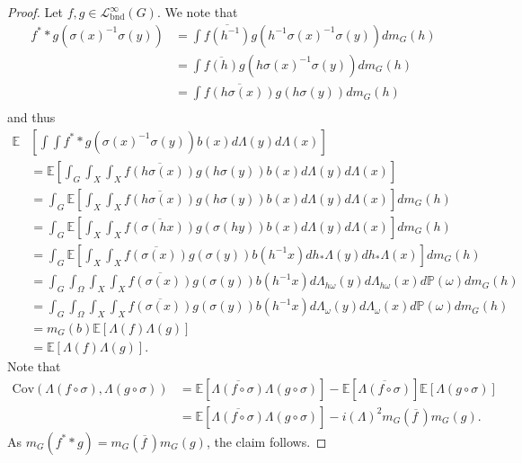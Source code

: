 \documentclass[12pt,reqno,a4paper]{amsart}
\theoremstyle{theorem}
\theoremstyle{definition}
\numberwithin{theorem}{section}
\numberwithin{equation}{section}
\begin{document}
\begin{proof}
	Let $f,g\in \mathcal{L}_{\mathrm{bnd}}^\infty(G)$. We note that
	\begin{align*}
		f^**g(\sigma(x)^{-1}\sigma(y)) &= \int \overline{f(h^{-1})}g(h^{-1}\sigma(x)^{-1}\sigma(y))dm_G(h)\\
		&= \int \overline{f(h)}g(h\sigma(x)^{-1}\sigma(y))dm_G(h)\\
		&= \int \overline{f(h\sigma(x))}g(h\sigma(y))dm_G(h)\\
	\end{align*}
	and thus
	\begin{align*}
		\mathbb{E}&\left[\int \int f^**g(\sigma(x)^{-1}\sigma(y))b(x)d\Lambda(y)d\Lambda(x)\right]\\
		&=\mathbb{E}\left[  \int_G \int_X\int_X \overline{f(h\sigma(x))}g(h\sigma(y))b(x)d\Lambda(y)d\Lambda(x)\right]\\
		&=  \int_G\mathbb{E}\left[\int_X \int_X  \overline{f(h\sigma(x))}g(h\sigma(y))b(x)d\Lambda(y)d\Lambda(x)\right]dm_G(h)\\
		&= \int_G\mathbb{E}\left[\int_X \int_X  \overline{f(\sigma(hx))}g(\sigma(hy))b(x)d\Lambda(y)d\Lambda(x)\right]dm_G(h)\\
		&= \int_G\mathbb{E}\left[\int_X \int_X  \overline{f(\sigma(x))}g(\sigma(y))b(h^{-1}x)dh_*\Lambda(y)dh_*\Lambda(x)\right]dm_G(h)\\
		&= \int_G\int_\Omega\int_X \int_X  \overline{f(\sigma(x))}g(\sigma(y))b(h^{-1}x)d\Lambda_{h\omega}(y)d\Lambda_{h\omega}(x)d\mathbb{P}(\omega)dm_G(h)\\
		&= \int_G\int_\Omega\int_X \int_X  \overline{f(\sigma(x))}g(\sigma(y))b(h^{-1}x)d\Lambda_{\omega}(y)d\Lambda_{\omega}(x)d\mathbb{P}(\omega)dm_G(h)\\
		&= m_G(b) \mathbb{E}[\Lambda(f)\Lambda(g)]\\
		&= \mathbb{E}[\Lambda(f)\Lambda(g)].
	\end{align*}
	Note that 
	\begin{align*}
		\mathrm{Cov}(\Lambda(f\circ\sigma),\Lambda(g\circ\sigma)) &= \mathbb{E}[\overline{\Lambda(f\circ\sigma)}\Lambda(g\circ\sigma)]-\mathbb{E}[\overline{\Lambda(f\circ\sigma)}]\mathbb{E}[\Lambda(g\circ\sigma)]\\
		&= \mathbb{E}[\overline{\Lambda(f\circ\sigma)}\Lambda(g\circ\sigma)]-i(\Lambda)^2m_G(\overline{f\hspace{2pt}})m_G(g).
	\end{align*}
	As $m_G(f^**g) = m_G(\overline{f\hspace{2pt}})m_G(g)$, the claim follows.
\end{proof}
\end{document}
